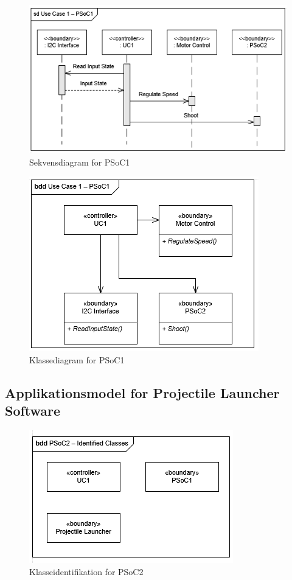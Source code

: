 \begin{figure}[H]
	\centering
	\includegraphics[scale=0.8]{Systemarkitektur/images/UC1PSoC1SequenceDiagram}
	\caption{Sekvensdiagram for PSoC1}
	\label{fig:sekvensUC1PSoC1}
\end{figure}

\begin{figure}[H]
	\centering
	\includegraphics[scale=0.8]{Systemarkitektur/images/klasseUC1PSoC1}
	\caption{Klassediagram for PSoC1}
	\label{fig:klasseUC1PSoC1}
\end{figure}

\subsection{Applikationsmodel for Projectile Launcher Software}

\begin{figure}[H]
	\centering
	\includegraphics[scale=0.8]{Systemarkitektur/images/klasseIdentificationUC1PSoC2}
	\caption{Klasseidentifikation for PSoC2}
	\label{fig:klasseidentifikationUC1PSoC2}
\end{figure}

